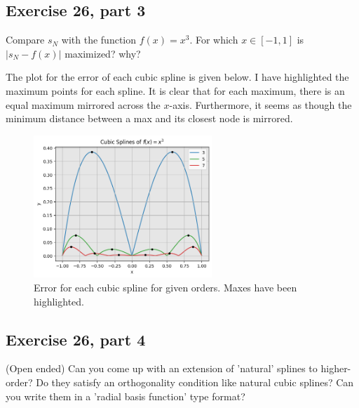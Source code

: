 \subsection{Exercise 26, part 3}
Compare $s_N$ with the function $f(x) = x^3$. For which $x \in [-1, 1]$ is $|s_N - f(x)|$ maximized? why?
\partbreak
\begin{solution}

    The plot for the error of each cubic spline is given below. I have highlighted the maximum points for each spline. It is clear that for each maximum, there is an equal maximum mirrored across the $x$-axis. Furthermore, it seems as though the minimum distance between a max and its closest node is mirrored. 
    
\end{solution}
\vspace{1in}
\begin{figure}[!ht]
    \centering
    \includegraphics[width = 0.6\textwidth]{Plots/Exercise 26b.png}
    \caption{Error for each cubic spline for given orders. Maxes have been highlighted.}
    \label{fig:Exercise 26b}
\end{figure}

\newpage


\newpage
\subsection{Exercise 26, part 4}
(Open ended) Can you come up with an extension of 'natural' splines to higher-order? Do they satisfy an orthogonality condition like natural cubic splines? Can you write them in a 'radial basis function' type format? 
